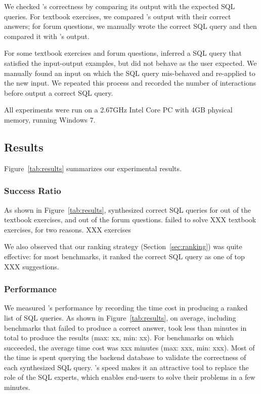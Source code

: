We checked \ourtool's correctness by comparing its
output with the expected SQL queries.
For textbook exercises, we compared \ourtool's output with
their correct answers; for forum questions, we
manually wrote the correct SQL query and then
compared it with \ourtool's output.

For some textbook exercises and forum questions,
\ourtool inferred a SQL query that satisfied the input-output
examples, but did not behave as the user expected.
We manually found an input on which the
SQL query mis-behaved and re-applied \ourtool to the new input. We
repeated this process and recorded the number of
interactions before \ourtool output a correct SQL query.


All experiments were run on a 2.67GHz Intel Core PC
with 4GB physical memory, running Windows 7.






\subsection{Results}

Figure~\ref{tab:results} summarizes our experimental results.

\subsubsection{Success Ratio}
\label{sec:ratio}


As shown in Figure~\ref{tab:results}, \ourtool
synthesized correct SQL queries for \solexnum  out of
\exnum the textbook exercises, and \solpnum out of
\pnum the forum questions.
\ourtool failed to solve XXX textbook exercises, for
two reasons. XXX exercises 

We also observed that our ranking strategy (Section~\ref{sec:ranking})
was quite effective: for most benchmarks, it ranked the correct
SQL query as one of top XXX suggestions.

%

\subsubsection{Performance}
\label{sec:performance}

We measured \ourtool's performance by recording the
time cost in producing a ranked list of SQL queries.
As shown in Figure~\ref{tab:results}, on average,
including benchmarks that \ourtool failed to produce
a correct answer,
\ourtool took less than \avgtime minutes in total to
produce the results (max: xx, min: xx).
For benchmarks on which \ourtool succeeded, the average
time cost was xxx minutes (max: xxx, min: xxx).
Most of the time is spent querying the backend
database to validate the correctness of each synthesized  SQL query.
\ourtool's speed makes it an attractive tool to replace
the role of the SQL experts, which
enables end-users to solve their problems in a few
minutes.

